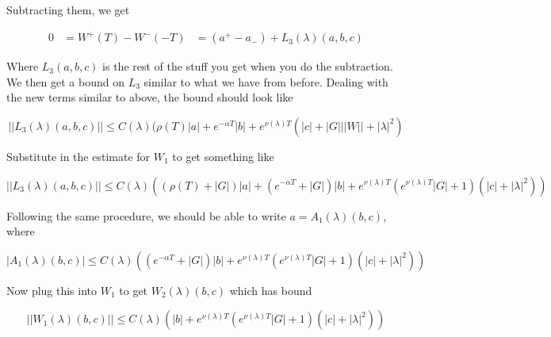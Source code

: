 \documentclass[12pt]{article}
\begin{document}
\begin{enumerate}
Subtracting them, we get

\begin{align*}
0 &= W^+(T) - W^-(-T) &= (a^+ - a_-) + L_3(\lambda)(a,b,c)
\end{align*}

Where $L_3(a,b,c)$ is the rest of the stuff you get when you do the subtraction. We then get a bound on $L_3$ similar to what we have from before. Dealing with the new terms similar to above, the bound should look like

\[
||L_3(\lambda)(a,b,c)|| \leq C(\lambda)(\rho(T)|a| + e^{-\alpha T}|b| + e^{\nu(\lambda)T}(|c| + |G|||W|| + |\lambda|^2 )
\]

Substitute in the estimate for $W_1$ to get something like

\[
||L_3(\lambda)(a,b,c)|| \leq C(\lambda)((\rho(T) + |G|)|a| + (e^{-\alpha T} + |G|)|b| + e^{\nu(\lambda)T}(e^{\nu(\lambda)T}|G| + 1)(|c| + |\lambda|^2 ))
\]

Following the same procedure, we should be able to write $a = A_1(\lambda)(b,c)$, where

\[
|A_1(\lambda)(b,c)| \leq C(\lambda)((e^{-\alpha T} + |G|)|b| + e^{\nu(\lambda)T}(e^{\nu(\lambda)T}|G| + 1)(|c| + |\lambda|^2 ))
\]

Now plug this into $W_1$ to get $W_2(\lambda)(b,c)$ which has bound

\[
||W_1(\lambda)(b,c)|| \leq C(\lambda)(|b| + e^{\nu(\lambda)T}(e^{\nu(\lambda)T}|G| + 1)(|c| + |\lambda|^2 ))
\]



\end{enumerate}
\end{document}
